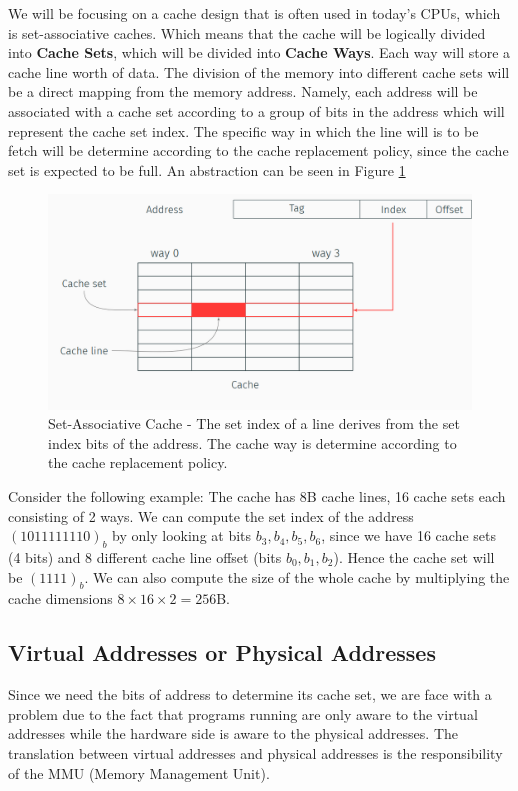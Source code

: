 We will be focusing on a cache design that is often used in today's CPUs, which is set-associative caches. Which means that the cache will be logically divided into \textbf{Cache Sets}, which will be divided into \textbf{Cache Ways}. Each way will store a cache line worth of data. The division of the memory into different cache sets will be a direct mapping from the memory address. Namely, each address will be associated with a cache set according to a group of bits in the address which will represent the cache set index. The specific way in which the line will is to be fetch will be determine according to the cache replacement policy, since the cache set is expected to be full.  An
abstraction can be seen in Figure \ref{fig:SetWay}


\begin{figure}
    \centering
    \includegraphics[width=\textwidth]{images/SetWay.PNG}
    \caption{Set-Associative Cache - The set index of a line derives from the set index bits of the address. The cache way is determine according to the cache replacement policy.}
    \label{fig:SetWay}
\end{figure}

Consider the following example: The cache has 8B cache lines, 16 cache sets each consisting of 2 ways. We can compute the set index of the address $(1011111110)_b$ by only looking at bits $b_3, b_4, b_5, b_6$, since we have 16 cache sets (4 bits) and 8 different cache line offset (bits $b_0, b_1, b_2$). Hence the cache set will be $(1111)_b$. We can also compute the size of the whole cache by multiplying the cache dimensions $8 \times 16 \times 2 = 256 $B.

\subsection{Virtual Addresses or Physical Addresses}
Since we need the bits of address to determine its cache set, we are face with a problem due to the fact that programs running are only aware to the virtual addresses while the hardware side is aware to the physical addresses. The translation between virtual addresses and physical addresses is the responsibility of the MMU (Memory Management Unit).

